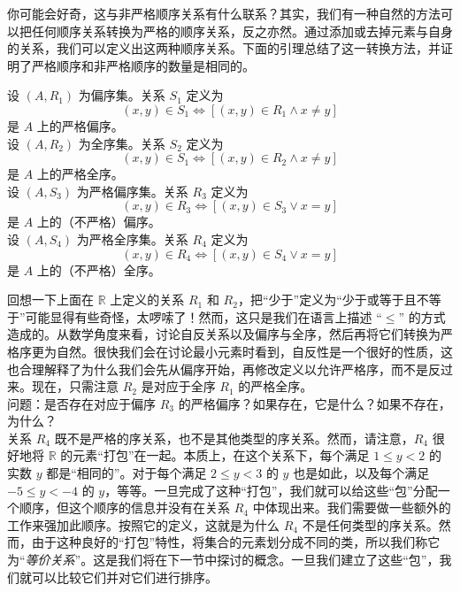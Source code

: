 你可能会好奇，这与非严格顺序关系有什么联系？其实，我们有一种自然的方法可以把任何顺序关系转换为严格的顺序关系，反之亦然。通过添加或去掉元素与自身的关系，我们可以定义出这两种顺序关系。下面的引理总结了这一转换方法，并证明了严格顺序和非严格顺序的数量是相同的。

\newpage

\begin{lemma}
    设 $(A, R_1)$ 为偏序集。关系 $S_1$ 定义为
    \[(x, y) \in S_1 \iff [(x, y) \in R_1 \land x \ne y]\]
    是 $A$ 上的严格偏序。\\

    设 $(A, R_2)$ 为全序集。关系 $S_2$ 定义为
    \[(x, y) \in S_1 \iff [(x, y) \in R_2 \land x \ne y]\]
    是 $A$ 上的严格全序。\\

    设 $(A, S_3)$ 为严格偏序集。关系 $R_3$ 定义为
    \[(x, y) \in R_3 \iff [(x, y) \in S_3 \lor x = y]\]
    是 $A$ 上的（不严格）偏序。\\

    设 $(A, S_4)$ 为严格全序集。关系 $R_4$ 定义为
    \[(x, y) \in R_4 \iff [(x, y) \in S_4 \lor x = y]\]
    是 $A$ 上的（不严格）全序。
\end{lemma}

回想一下上面在 $\mathbb{R}$ 上定义的关系 $R_1$ 和 $R_2$，把``少于''定义为``少于或等于且不等于''可能显得有些奇怪，太啰嗦了！然而，这只是我们在语言上描述 ``$\le$'' 的方式造成的。从数学角度来看，讨论自反关系以及偏序与全序，然后再将它们转换为严格序更为自然。很快我们会在讨论最小元素时看到，自反性是一个很好的性质，这也合理解释了为什么我们会先从偏序开始，再修改定义以允许严格序，而不是反过来。现在，只需注意 $R_2$ 是对应于全序 $R_1$ 的严格全序。\\

问题：是否存在对应于偏序 $R_3$ 的严格偏序？如果存在，它是什么？如果不存在，为什么？\\

关系 $R_4$ 既不是严格的序关系，也不是其他类型的序关系。然而，请注意，$R_4$ 很好地将 $\mathbb{R}$ 的元素``打包''在一起。本质上，在这个关系下，每个满足 $1 \le y < 2$ 的实数 $y$ 都是``相同的''。对于每个满足 $2 \le y < 3$ 的 $y$ 也是如此，以及每个满足 $-5 \le y < -4$ 的 $y$，等等。一旦完成了这种``打包''，我们就可以给这些``包''分配一个顺序，但这个顺序的信息并没有在关系 $R_4$ 中体现出来。我们需要做一些额外的工作来强加此顺序。按照它的定义，这就是为什么 $R_4$ 不是任何类型的序关系。然而，由于这种良好的``打包''特性，将集合的元素划分成不同的类，所以我们称它为``\emph{等价关系}''。这是我们将在下一节中探讨的概念。一旦我们建立了这些``包''，我们就可以比较它们并对它们进行排序。\\

